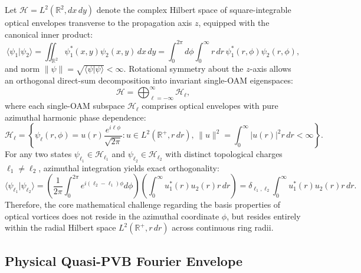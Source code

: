 \documentclass[11pt,a4paper]{article}
\begin{document}
Let $\mathcal{H} = L^2(\mathbb{R}^2, dx \, dy)$ denote the complex Hilbert space of square-integrable optical envelopes transverse to the propagation axis $z$, equipped with the canonical inner product:
\begin{equation}
\langle \psi_1 | \psi_2 \rangle = \iint_{\mathbb{R}^2} \psi_1^*(x, y) \psi_2(x, y) \, dx \, dy = \int_0^{2\pi} d\phi \int_0^\infty r \, dr \, \psi_1^*(r, \phi) \psi_2(r, \phi),
\label{eq:hilbert_inner_product}
\end{equation}
and norm $\|\psi\| = \sqrt{\langle \psi | \psi \rangle} < \infty$. Rotational symmetry about the $z$-axis allows an orthogonal direct-sum decomposition into invariant single-OAM eigenspaces:
\begin{equation}
\mathcal{H} = \bigoplus_{\ell=-\infty}^\infty \mathcal{H}_\ell,
\label{eq:direct_sum_decomposition}
\end{equation}
where each single-OAM subspace $\mathcal{H}_\ell$ comprises optical envelopes with pure azimuthal harmonic phase dependence:
\begin{equation}
\mathcal{H}_\ell = \left\{ \psi_\ell(r, \phi) = u(r) \frac{e^{i \ell \phi}}{\sqrt{2\pi}} : u \in L^2(\mathbb{R}^+, r \, dr), \, \|u\|^2 = \int_0^\infty |u(r)|^2 r \, dr < \infty \right\}.
\label{eq:single_oam_subspace}
\end{equation}
For any two states $\psi_{\ell_1} \in \mathcal{H}_{\ell_1}$ and $\psi_{\ell_2} \in \mathcal{H}_{\ell_2}$ with distinct topological charges $\ell_1 \neq \ell_2$, azimuthal integration yields exact orthogonality:
\begin{equation}
\langle \psi_{\ell_1} | \psi_{\ell_2} \rangle = \left( \frac{1}{2\pi} \int_0^{2\pi} e^{i(\ell_2 - \ell_1)\phi} d\phi \right) \left( \int_0^\infty u_1^*(r) u_2(r) r \, dr \right) = \delta_{\ell_1, \ell_2} \int_0^\infty u_1^*(r) u_2(r) r \, dr.
\label{eq:azimuthal_orthogonality}
\end{equation}
Therefore, the core mathematical challenge regarding the basis properties of optical vortices does not reside in the azimuthal coordinate $\phi$, but resides entirely within the radial Hilbert space $L^2(\mathbb{R}^+, r \, dr)$ across continuous ring radii.

\subsection{Physical Quasi-PVB Fourier Envelope}
\end{document}
